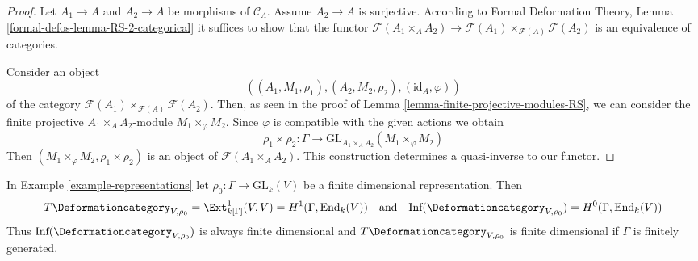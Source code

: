 \begin{proof}
Let $A_1 \to A$ and $A_2 \to A$ be morphisms of $\mathcal{C}_\Lambda$.
Assume $A_2 \to A$ is surjective. According to
Formal Deformation Theory, Lemma
\ref{formal-defos-lemma-RS-2-categorical}
it suffices to show that the functor
$\mathcal{F}(A_1 \times_A A_2) \to
\mathcal{F}(A_1) \times_{\mathcal{F}(A)} \mathcal{F}(A_2)$
is an equivalence of categories.

\medskip\noindent
Consider an object
$$
((A_1, M_1, \rho_1), (A_2, M_2, \rho_2), (\text{id}_A, \varphi))
$$
of the category $\mathcal{F}(A_1) \times_{\mathcal{F}(A)} \mathcal{F}(A_2)$.
Then, as seen in the proof of Lemma \ref{lemma-finite-projective-modules-RS},
we can consider the finite projective
$A_1 \times_A A_2$-module $M_1 \times_\varphi M_2$.
Since $\varphi$ is compatible with the given actions we obtain
$$
\rho_1 \times \rho_2 : \Gamma \longrightarrow
\text{GL}_{A_1 \times_A A_2}(M_1 \times_\varphi M_2)
$$
Then $(M_1 \times_\varphi M_2, \rho_1 \times \rho_2)$
is an object of $\mathcal{F}(A_1 \times_A A_2)$.
This construction determines a quasi-inverse to our functor.
\end{proof}

\begin{lemma}
\label{lemma-representations-TI}
In Example \ref{example-representations} let 
$\rho_0 : \Gamma \to \text{GL}_k(V)$
be a finite dimensional representation. Then
$$
T\Deformationcategory_{V, \rho_0} = \Ext^1_{k[\Gamma]}(V, V) =
H^1(\Gamma, \text{End}_k(V))
\quad\text{and}\quad
\text{Inf}(\Deformationcategory_{V, \rho_0}) = H^0(\Gamma, \text{End}_k(V))
$$
Thus $\text{Inf}(\Deformationcategory_{V, \rho_0})$
is always finite dimensional
and $T\Deformationcategory_{V, \rho_0}$ is finite dimensional
if $\Gamma$ is finitely generated.
\end{lemma}

